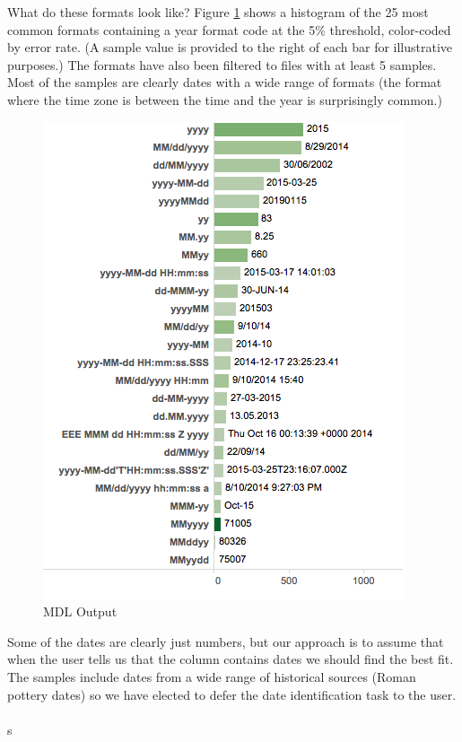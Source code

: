 What do these formats look like? Figure \ref{fig:M3} shows a histogram of the 25 most common formats containing a year format code at the 5\% threshold, color-coded by error rate. (A sample value is provided to the right of each bar for illustrative purposes.) The formats have also been filtered to files with at least 5 samples. Most of the samples are clearly dates with a wide range of formats (the format where the time zone is between the time and the year is surprisingly common.)
 
\begin{figure}[ht]
\centering
\includegraphics[width=\columnwidth]{figures/FigureM3}
\caption{MDL Output}
\label{fig:M3}
\end{figure}


Some of the dates are clearly just numbers, but our approach is to assume that when the user tells us that the column contains dates we should find the best fit. The samples include dates from a wide range of historical sources (\eg Roman pottery dates) so we have elected to defer the date identification task to the user.\\\\s

